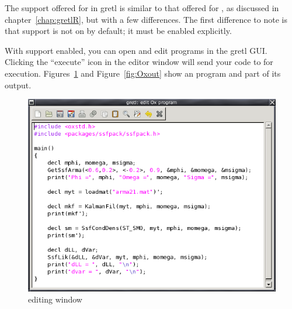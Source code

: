 The support offered for  in gretl is similar to that
offered for , as discussed in chapter~\ref{chap:gretlR}, but
with a few differences.  The first difference to note is that 
 support is not on by default; it must be enabled explicitly.

  
With support enabled, you can open and edit  programs in the
gretl GUI.  Clicking the ``execute'' icon in the editor window
will send your code to  for execution.
Figures~\ref{fig:Oxedit} and Figure~\ref{fig:Oxout} show an 
program and part of its output.

\begin{figure}[htbp]
  \centering
  \includegraphics[scale=0.7]{figures/Oxedit}
  \caption{ editing window}
  \label{fig:Oxedit}
\end{figure}

